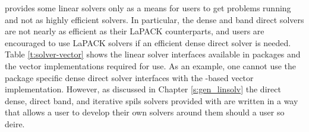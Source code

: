 {\sundials} provides some linear solvers only as a means for 
users to get problems running and not as highly efficient solvers.
In particular, the dense and band direct solvers are not nearly as efficient as
their LaPACK counterparts, and users are encouraged to use LaPACK solvers
if an efficient dense direct solver is needed.
Table \ref{t:solver-vector} shows the linear solver interfaces
available in {\sundials} packages and the vector implementations
required for use.  As an example, one cannot use the {\sundials} package
specific dense direct
solver interfaces  with the \mpi-based vector implementation.  However, 
as discussed in Chapter \ref{s:gen_linsolv} the direct dense, direct band, 
and iterative spils solvers provided with
{\sundials} are written in a way that allows a user to develop 
their own solvers around them should a user so deire.  

